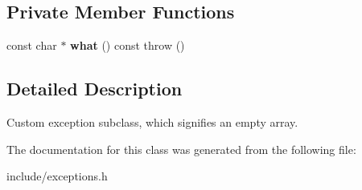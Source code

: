 \subsection*{Private Member Functions}
\begin{DoxyCompactItemize}
\item 
\mbox{\label{classArrayEmptyError_a5a24151f18d18d9c04df7925a7494d77}} 
const char $\ast$ {\bfseries what} () const  throw ()
\end{DoxyCompactItemize}


\subsection{Detailed Description}
Custom exception subclass, which signifies an empty array. 

The documentation for this class was generated from the following file\+:\begin{DoxyCompactItemize}
\item 
include/exceptions.\+h\end{DoxyCompactItemize}
